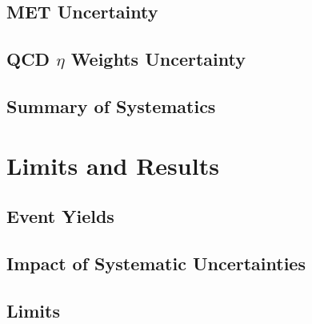 \subsection{MET Uncertainty }
\subsection{QCD $\eta$ Weights Uncertainty}
\subsection{Summary of Systematics}

\section{Limits and Results}
\subsection{Event Yields}
\subsection{Impact of Systematic Uncertainties}
\subsection{Limits}